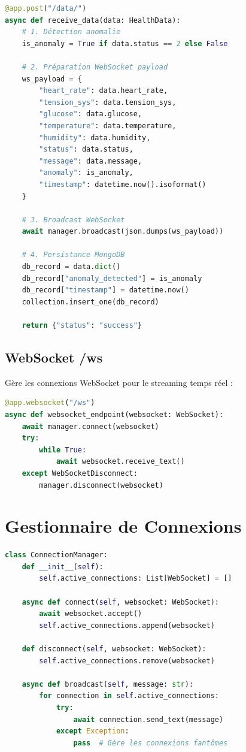 \documentclass[12pt,french]{report}
\begin{document}
\begin{lstlisting}[language=Python, caption=Endpoint POST]
@app.post("/data/")
async def receive_data(data: HealthData):
    # 1. Détection anomalie
    is_anomaly = True if data.status == 2 else False
    
    # 2. Préparation WebSocket payload
    ws_payload = {
        "heart_rate": data.heart_rate,
        "tension_sys": data.tension_sys,
        "glucose": data.glucose,
        "temperature": data.temperature,
        "humidity": data.humidity,
        "status": data.status,
        "message": data.message,
        "anomaly": is_anomaly,
        "timestamp": datetime.now().isoformat()
    }
    
    # 3. Broadcast WebSocket
    await manager.broadcast(json.dumps(ws_payload))
    
    # 4. Persistance MongoDB
    db_record = data.dict()
    db_record["anomaly_detected"] = is_anomaly
    db_record["timestamp"] = datetime.now()
    collection.insert_one(db_record)
    
    return {"status": "success"}
\end{lstlisting}

\subsection{WebSocket /ws}

Gère les connexions WebSocket pour le streaming temps réel :

\begin{lstlisting}[language=Python, caption=Endpoint WebSocket]
@app.websocket("/ws")
async def websocket_endpoint(websocket: WebSocket):
    await manager.connect(websocket)
    try:
        while True:
            await websocket.receive_text()
    except WebSocketDisconnect:
        manager.disconnect(websocket)
\end{lstlisting}

\section{Gestionnaire de Connexions}

\begin{lstlisting}[language=Python, caption=ConnectionManager]
class ConnectionManager:
    def __init__(self):
        self.active_connections: List[WebSocket] = []

    async def connect(self, websocket: WebSocket):
        await websocket.accept()
        self.active_connections.append(websocket)

    def disconnect(self, websocket: WebSocket):
        self.active_connections.remove(websocket)

    async def broadcast(self, message: str):
        for connection in self.active_connections:
            try:
                await connection.send_text(message)
            except Exception:
                pass  # Gère les connexions fantômes
\end{lstlisting}
\end{document}
